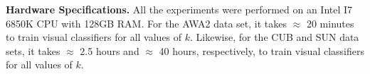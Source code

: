 \par
\bigskip
\bigskip
\noindent
\textbf{Hardware Specifications.} All the experiments were performed on an Intel I7 6850K CPU with 128GB RAM. For the AWA2 data set, it takes $\approx$ 20 minutes to train visual classifiers for all values of $k$.  Likewise, for the CUB and SUN data sets, it takes $\approx$ 2.5 hours and $\approx$ 40 hours, respectively, to train visual classifiers for all values of $k$.





\newpage